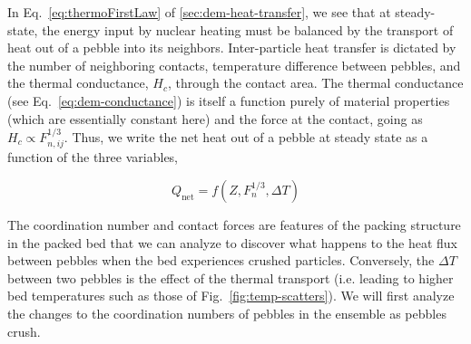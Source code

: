 In Eq.~\ref{eq:thermoFirstLaw} of \cref{sec:dem-heat-transfer}, we see that at steady-state, the energy input by nuclear heating must be balanced by the transport of heat out of a pebble into its neighbors. Inter-particle heat transfer is dictated by the number of neighboring contacts, temperature difference between pebbles, and the thermal conductance, $H_{c}$, through the contact area. The thermal conductance (see Eq.~\ref{eq:dem-conductance}) is itself a function purely of material properties  (which are essentially constant here) and the force at the contact, going as $H_{c} \propto F_{n,ij}^{1/3}$. Thus, we write the net heat out of a pebble at steady state as a function of the three variables,

\begin{equation}
	Q_\text{net} =f( Z, F_n^{1/3}, \Delta T)
\end{equation}

The coordination number and contact forces are features of the packing structure in the packed bed that we can analyze to discover what happens to the heat flux between pebbles when the bed experiences crushed particles. Conversely, the $\Delta T$ between two pebbles is the effect of the thermal transport (i.e. leading to higher bed temperatures such as those of Fig.~\ref{fig:temp-scatters}). We will first analyze the changes to the coordination numbers of pebbles in the ensemble as pebbles crush.


